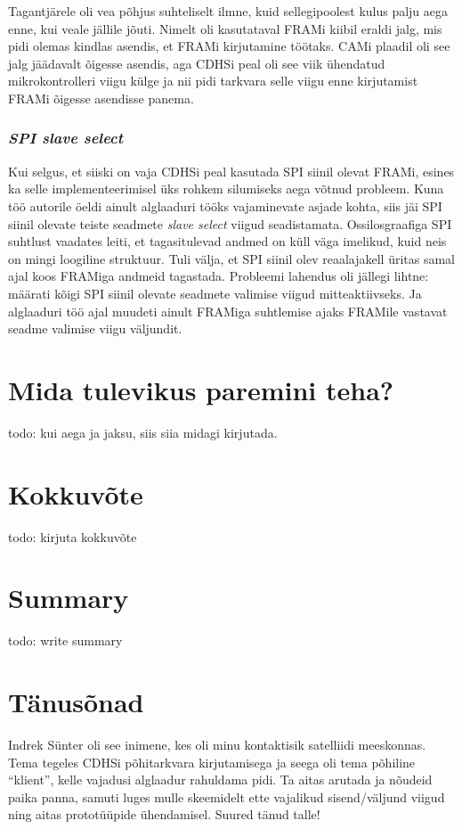 \documentclass[12pt,a4paper]{article}
\begin{document}
Tagantjärele oli vea põhjus suhteliselt ilmne, kuid sellegipoolest kulus palju
aega enne, kui veale jällile jõuti. Nimelt oli kasutataval FRAMi kiibil eraldi
jalg, mis pidi olemas kindlas asendis, et FRAMi kirjutamine töötaks. CAMi
plaadil oli see jalg jäädavalt õigesse asendis, aga CDHSi peal oli see viik
ühendatud mikrokontrolleri viigu külge ja nii pidi tarkvara selle viigu enne
kirjutamist FRAMi õigesse asendisse panema.

\subsubsection{\textit{SPI slave select}}
Kui selgus, et siiski on vaja CDHSi peal kasutada SPI siinil olevat FRAMi,
esines ka selle implementeerimisel üks rohkem silumiseks aega võtnud probleem.
Kuna töö autorile öeldi ainult alglaaduri tööks vajaminevate asjade kohta, siis
jäi SPI siinil olevate teiste seadmete \textit{slave select} viigud
seadistamata. Ossilosgraafiga SPI suhtlust vaadates leiti, et tagasitulevad
andmed on küll väga imelikud, kuid neis on mingi loogiline struktuur. Tuli
välja, et SPI siinil olev reaalajakell üritas samal ajal koos FRAMiga andmeid
tagastada. Probleemi lahendus oli jällegi lihtne: määrati kõigi SPI siinil
olevate seadmete valimise viigud mitteaktiivseks. Ja alglaaduri töö ajal muudeti
ainult FRAMiga suhtlemise ajaks FRAMile vastavat seadme valimise viigu väljundit.

\section{Mida tulevikus paremini teha?}
todo: kui aega ja jaksu, siis siia midagi kirjutada.
\section{Kokkuvõte}
todo: kirjuta kokkuvõte
\section{Summary}
todo: write summary
\section{Tänusõnad}
Indrek Sünter oli see inimene, kes oli minu kontaktisik satelliidi meeskonnas.
Tema tegeles CDHSi põhitarkvara kirjutamisega ja seega oli tema põhiline
``klient'', kelle vajadusi alglaadur rahuldama pidi. Ta aitas arutada ja nõudeid
paika panna, samuti luges mulle skeemidelt ette vajalikud sisend/väljund viigud
ning aitas prototüüpide ühendamisel. Suured tänud talle!
\end{document}
